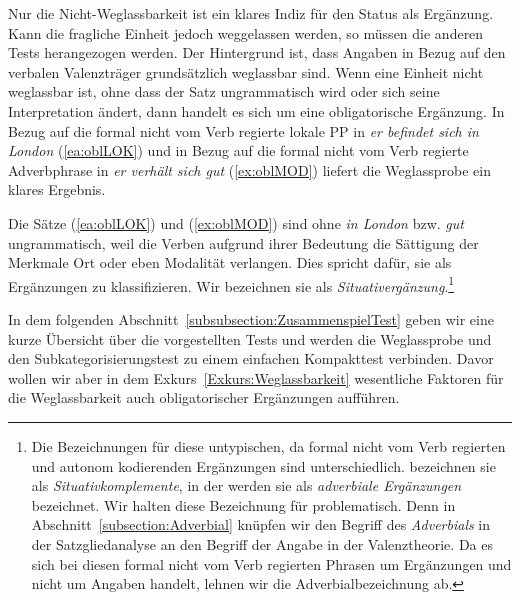 \label{ea:bestehlen_itr}  
\z 

Nur die Nicht-Weglassbarkeit ist ein klares Indiz für den Status als Ergänzung. Kann die fragliche Einheit jedoch weggelassen werden, so müssen die anderen Tests herangezogen werden. Der Hintergrund ist, dass Angaben in Bezug auf den verbalen Valenzträger grundsätzlich weglassbar sind. Wenn eine Einheit nicht weglassbar ist, ohne dass der Satz ungrammatisch wird oder sich seine Interpretation ändert, dann handelt es sich um eine obligatorische Ergänzung. In Bezug auf die formal nicht vom Verb regierte lokale PP in \textit{er befindet sich in London} (\ref{ea:oblLOK}) und in Bezug auf die formal nicht vom Verb regierte Adverbphrase in \textit{er verhält sich gut} (\ref{ex:oblMOD}) liefert die  Weglassprobe ein klares Ergebnis.  

\ea 
{}\label{ea:oblLOK} 
\label{ex:oblMOD}   
\z 
\z 

Die Sätze (\ref{ea:oblLOK}) und (\ref{ex:oblMOD}) sind ohne \textit{in London} bzw. \textit{gut} ungrammatisch, weil die Verben aufgrund ihrer Bedeutung die Sättigung der Merkmale Ort oder eben Modalität verlangen. Dies spricht dafür, sie als Ergänzungen zu klassifizieren. Wir bezeichnen sie als \textit{Situativergänzung}.\footnote{Die Bezeichnungen für diese untypischen, da formal nicht vom Verb regierten und autonom kodierenden Ergänzungen sind unterschiedlich. \citet[1101]{ZifHoffStr1997} bezeichnen sie als \textit{Situativkomplemente}, in der \citet[485--486, §798]{Duden2022} werden sie als \textit{adverbiale Ergänzungen} bezeichnet. Wir halten diese Bezeichnung für problematisch. Denn in Abschnitt~\ref{subsection:Adverbial} knüpfen wir den Begriff des \textit{Adverbials} in der Satzgliedanalyse an den Begriff der Angabe in der Valenztheorie. Da es sich bei diesen formal nicht vom Verb regierten Phrasen um Ergänzungen und nicht um Angaben handelt, lehnen wir die Adverbialbezeichnung ab.}

In dem folgenden Abschnitt~\ref{subsubsection:ZusammenspielTest} geben wir eine kurze Übersicht über die vorgestellten Tests und werden die Weglassprobe und den Subkategorisierungstest zu einem einfachen Kompakttest verbinden. Davor wollen wir aber in dem Exkurs~\ref{Exkurs:Weglassbarkeit} wesentliche Faktoren für die Weglassbarkeit auch obligatorischer Ergänzungen aufführen.


